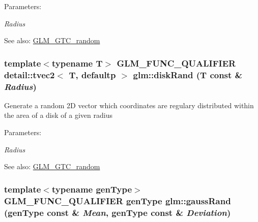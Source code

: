 \begin{Desc}
\item[Parameters:]
\begin{description}
\item[{\em Radius}]\end{description}
\end{Desc}
\begin{Desc}
\item[See also:]\hyperlink{group__gtc__random}{GLM\_\-GTC\_\-random} \end{Desc}
\hypertarget{group__gtc__random_gea707507f941467133dfdd4f3de9eeed}{
\subsubsection[diskRand]{\setlength{\rightskip}{0pt plus 5cm}template$<$typename T$>$ GLM\_\-FUNC\_\-QUALIFIER detail::tvec2$<$ T, defaultp $>$ glm::diskRand (T const \& {\em Radius})}}
\label{group__gtc__random_gea707507f941467133dfdd4f3de9eeed}


Generate a random 2D vector which coordinates are regulary distributed within the area of a disk of a given radius

\begin{Desc}
\item[Parameters:]
\begin{description}
\item[{\em Radius}]\end{description}
\end{Desc}
\begin{Desc}
\item[See also:]\hyperlink{group__gtc__random}{GLM\_\-GTC\_\-random} \end{Desc}
\hypertarget{group__gtc__random_gc045638daf634b0221ef4baaaf643cb2}{
\subsubsection[gaussRand]{\setlength{\rightskip}{0pt plus 5cm}template$<$typename genType$>$ GLM\_\-FUNC\_\-QUALIFIER genType glm::gaussRand (genType const \& {\em Mean}, \/  genType const \& {\em Deviation})}}
\label{group__gtc__random_gc045638daf634b0221ef4baaaf643cb2}


